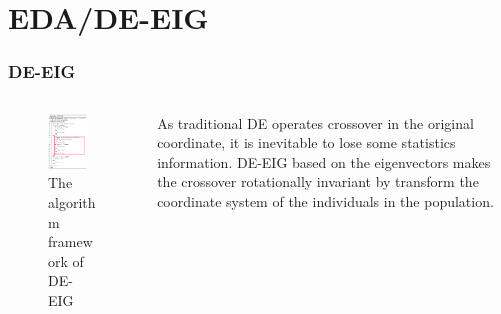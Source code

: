 \documentclass[xcolor=dvipsnames]{beamer}
\begin{document}
    \section{EDA/DE-EIG}
    \begin{frame}
    \frametitle{DE-EIG}
    \begin{columns}
        \begin{column}{0.5\textwidth}
        \begin{figure}[H]
            \graphicspath{{figs/}}
            \includegraphics[width=0.8\textwidth]{de-eig.png}
            \caption{The algorithm framework of DE-EIG}
        \end{figure}
    \end{column}
    \begin{column}{0.5\textwidth}
    As traditional DE operates crossover in the original coordinate, it is inevitable to lose some statistics information. DE-EIG based on the eigenvectors makes the crossover rotationally invariant by transform the coordinate system of the individuals in the population.
    \end{column}
    \end{columns}
    \end{frame}
\end{document}
